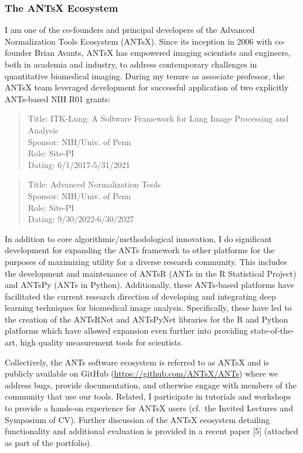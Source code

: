 \documentclass[
  11pt,
]{article}
\begin{document}
\hypertarget{the-antsx-ecosystem}{%
\subsubsection{The ANTsX Ecosystem}\label{the-antsx-ecosystem}}

I am one of the co-founders and principal developers of the Advanced
Normalization Tools Ecosystem (ANTsX). Since its inception in 2006 with
co-founder Brian Avants, ANTsX has empowered imaging scientists and
engineers, both in academia and industry, to address contemporary
challenges in quantitative biomedical imaging. During my tenure as
associate professor, the ANTsX team leveraged development for successful
application of two explicitly ANTs-based NIH R01 grants:

\begin{quote}
Title: ITK-Lung: A Software Framework for Lung Image Processing and
Analysis\\
Sponsor: NIH/Univ. of Penn\\
Role: Site-PI\\
Dating: 6/1/2017-5/31/2021
\end{quote}

\begin{quote}
Title: Advanced Normalization Tools\\
Sponsor: NIH/Univ. of Penn\\
Role: Site-PI\\
Dating: 9/30/2022-6/30/2027
\end{quote}

In addition to core algorithmic/methodological innovation, I do
significant development for expanding the ANTs framework to other
platforms for the purposes of maximizing utility for a diverse research
community. This includes the development and maintenance of ANTsR (ANTs
in the R Statistical Project) and ANTsPy (ANTs in Python). Additionally,
these ANTs-based platforms have facilitated the current research
direction of developing and integrating deep learning techniques for
biomedical image analysis. Specifically, these have led to the creation
of the ANTsRNet and ANTsPyNet libraries for the R and Python platforms
which have allowed expansion even further into providing
state-of-the-art, high quality measurement tools for scientists.

Collectively, the ANTs software ecosystem is referred to as ANTsX and is
publicly available on GitHub (\url{https://github.com/ANTsX/ANTs}) where
we address bugs, provide documentation, and otherwise engage with
members of the community that use our tools. Related, I participate in
tutorials and workshops to provide a hands-on experience for ANTsX users
(cf.~the Invited Lectures and Symposium of CV). Further discussion of
the ANTsX ecosystem detailing functionality and additional evaluation is
provided in a recent paper {[}5{]} (attached as part of the portfolio).
\end{document}
